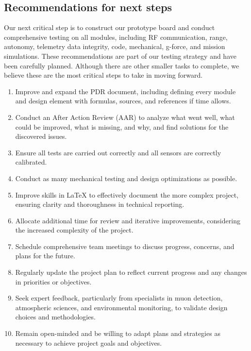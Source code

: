 \subsection{Recommendations for next steps}
Our next critical step is to construct our prototype board and conduct comprehensive testing on all modules, including RF communication, range, autonomy, telemetry data integrity, code, mechanical, g-force, and mission simulations. These recommendations are part of our testing strategy and have been carefully planned. Although there are other smaller tasks to complete, we believe these are the most critical steps to take in moving forward.

\begin{enumerate}[leftmargin=1cm, itemindent=0.25cm, noitemsep, topsep=0pt]
\item Improve and expand the PDR document, including defining every module and design element with formulas, sources, and references if time allows.
\item Conduct an After Action Review (AAR) to analyze what went well, what could be improved, what is missing, and why, and find solutions for the discovered issues.
\item Ensure all tests are carried out correctly and all sensors are correctly calibrated.
\item Conduct as many mechanical testing and design optimizations as possible.
\item Improve skills in LaTeX to effectively document the more complex project, ensuring clarity and thoroughness in technical reporting.
\item Allocate additional time for review and iterative improvements, considering the increased complexity of the project.
\item Schedule comprehensive team meetings to discuss progress, concerns, and plans for the future.
\item Regularly update the project plan to reflect current progress and any changes in priorities or objectives.
\item Seek expert feedback, particularly from specialists in muon detection, atmospheric sciences, and environmental monitoring, to validate design choices and methodologies.
\item Remain open-minded and be willing to adapt plans and strategies as necessary to achieve project goals and objectives.
\end{enumerate}
